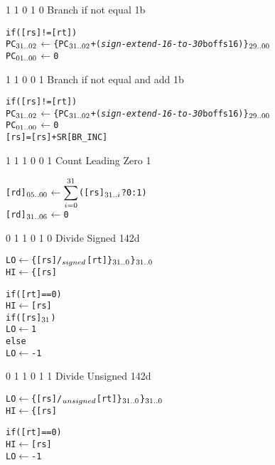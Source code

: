      {1 1 0 1 0} {Branch if not equal}                   {1b}   {\RawTag}
\begin{alltt}
        if ([rs] != [rt])
           PC\({\sb{31..02}}\) \(\leftarrow\) \{ PC\({\sb{31..02}}\) + ({\em{sign-extend-16-to-30}} boffs16) \}\(\sb{29..00}\)
           PC\({\sb{01..00}}\) \(\leftarrow\) 0
\end{alltt}\rawInstrEnd

     {1 1 0 0 1} {Branch if not equal and add}                   {1b}   {\RawTag}
\begin{alltt}
        if ([rs] != [rt])
           PC\({\sb{31..02}}\) \(\leftarrow\) \{ PC\({\sb{31..02}}\) + ({\em{sign-extend-16-to-30}} boffs16) \}\(\sb{29..00}\)
           PC\({\sb{01..00}}\) \(\leftarrow\) 0
        [rs] = [rs] + SR[BR_INC]
\end{alltt}\rawInstrEnd

   {1 1 1 0 0 1}    {Count Leading Zero}                           {1}    {\RawTag}
\begin{alltt}
        [rd]\({\sb{05..00}}\) \(\leftarrow\) \(\displaystyle\sum\sb{i=0}\sp{31}\) ([rs]\({\sb{31..i}}\) ? 0 : 1)
        [rd]\({\sb{31..06}}\) \(\leftarrow\) 0
\end{alltt}\rawInstrEnd

   {0 1 1 0 1 0}    {Divide Signed}                           {1}{42d}    {\RawTag}
\begin{alltt}
        LO \(\leftarrow\) \{ [rs] /\(\sb{signed}\) [rt] \}\(\sb{31..0}\) \}\(\sb{31..0}\)
        HI \(\leftarrow\) \{ [rs] %\(\sb{signed}\) [rt] \}\(\sb{31..0}\) \}\(\sb{63..32}\)

        if ([rt] == 0)
           HI \(\leftarrow\) [rs]
           if ([rs]\({\sb{31}}\))
              LO \(\leftarrow\) 1
           else
              LO \(\leftarrow\) -1
\end{alltt}\rawInstrEnd

   {0 1 1 0 1 1}    {Divide Unsigned}                           {1}{42d}    {\RawTag}
\begin{alltt}
        LO \(\leftarrow\) \{ [rs] /\(\sb{unsigned}\) [rt] \}\(\sb{31..0}\) \}\(\sb{31..0}\)
        HI \(\leftarrow\) \{ [rs] %\(\sb{unsigned}\) [rt] \}\(\sb{31..0}\) \}\(\sb{63..32}\)

        if ([rt] == 0)
           HI \(\leftarrow\) [rs]
           LO \(\leftarrow\) -1
\end{alltt}\rawInstrEnd

